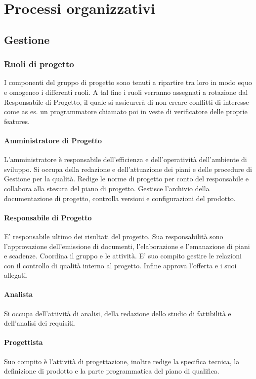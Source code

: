 \section{Processi organizzativi}
\subsection{Gestione}
\subsubsection{Ruoli di progetto}
I componenti del gruppo di progetto sono tenuti a ripartire tra loro in modo equo e omogeneo i differenti ruoli. A tal fine i ruoli verranno assegnati a rotazione dal Responsabile di Progetto, il quale si assicurerà di non creare conflitti di interesse come as es. un programmatore chiamato poi in veste di verificatore delle proprie features.
\paragraph{Amministratore di Progetto} L'amministratore è responsabile dell'efficienza e dell'operatività dell'ambiente di sviluppo. Si occupa della redazione e dell'attuazione dei piani e delle procedure di Gestione per la qualità. Redige le norme di progetto per conto del responsabile e collabora alla stesura del piano di progetto. Gestisce l'archivio della documentazione di progetto, controlla versioni e configurazioni del prodotto.
\paragraph{Responsabile di Progetto}E' responsabile ultimo dei risultati del progetto. Sua responsabilità sono l'approvazione dell'emissione di documenti, l'elaborazione e l'emanazione di piani e scadenze. Coordina il gruppo e le attività. E' suo compito gestire le relazioni con il controllo di qualità interno al progetto. Infine approva l'offerta e i suoi allegati.
\paragraph{Analista} Si occupa dell'attività di analisi, della redazione dello studio di fattibilità e dell'analisi dei requisiti.
\paragraph{Progettista} Suo compito è l'attività di progettazione, inoltre redige la specifica tecnica, la definizione di prodotto e la parte programmatica del piano di qualifica. 

